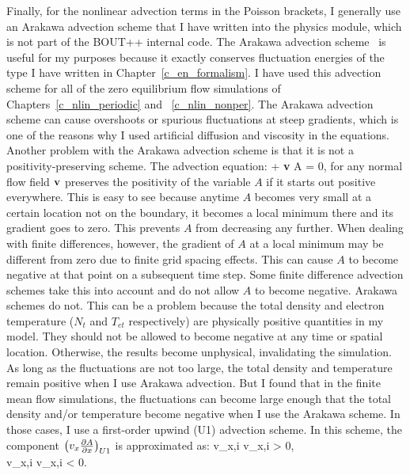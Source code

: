 Finally, for the nonlinear advection terms in the Poisson brackets, I generally use an Arakawa advection scheme that I have written into the physics module, which is not part of the BOUT++ internal
code. The Arakawa advection scheme~\cite{arakawa1966} is useful for my purposes because it exactly conserves fluctuation energies of the type I have written in Chapter~\ref{c_en_formalism}.
I have used this advection scheme for all of the zero equilibrium flow simulations of Chapters~\ref{c_nlin_periodic} and ~\ref{c_nlin_nonper}. The Arakawa advection scheme can cause overshoots
or spurious fluctuations at steep gradients, which is one of the reasons why I used artificial diffusion and viscosity in the equations. Another problem with the Arakawa advection scheme
is that it is not a positivity-preserving scheme. The advection equation:
\beq
\label{advec_eqn}
 + {\bf v} \cdot \grad A = 0,
\eeq
for any normal flow field ${\bf v}$ preserves the positivity of the variable $A$ if it starts out positive everywhere. This is easy to see because anytime $A$ becomes very small at a certain
location not on the boundary, it becomes a local minimum there and its gradient goes to zero. This prevents $A$ from decreasing any further. When dealing with finite differences, however,
the gradient of $A$ at a local minimum may be different from zero due to finite grid spacing effects. This can cause $A$ to become negative at that point on a subsequent time step. Some finite
difference advection schemes take this into account and do not allow $A$ to become negative. Arakawa schemes do not. This can be a problem because the total density and electron temperature
($N_t$ and $T_{et}$ respectively) are physically positive quantities in my model. They should not be allowed to become negative at any time or spatial location. Otherwise, the results
become unphysical, invalidating the simulation. As long as the fluctuations are not too large, the total density and temperature remain positive when I use Arakawa advection. But I found
that in the finite mean flow simulations, the fluctuations can become large enough that the total density and/or temperature become negative when I use the Arakawa scheme.
In those cases, I use a first-order upwind (U1) advection scheme. In this scheme, the component $\left( v_x \frac{\partial A}{\partial x} \right)_{U1}$ is approximated as:
\beqar
\label{upwind_def}
v_{x,i}   \quad v_{x,i} > 0, \nonumber \\
v_{x,i}   \quad v_{x,i} < 0.
\eeqar
